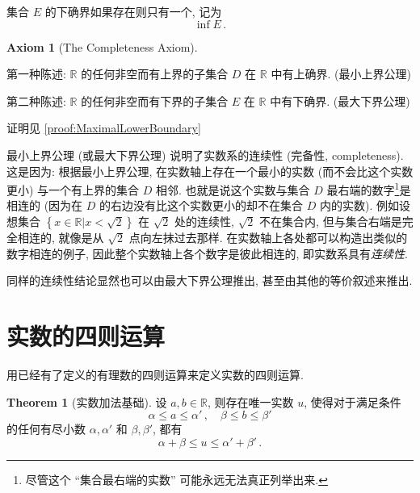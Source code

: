 \documentclass{book}
\newcommand{\set}[1]{\left\{#1\right\}}
\newcommand{\R}{\mathbb{R}}
\numberwithin{equation}{section}
\numberwithin{figure}{section}
\theoremstyle{definition}
\newtheorem{theorem}{Theorem}[section]
\newtheorem{axiom}{Axiom}
\newcommand{\dq}[1]{``#1''}
\begin{document}
集合 $E$ 的下确界如果存在则只有一个, 记为
\begin{equation*}
  \inf E\,.
\end{equation*}

\begin{axiom}[The Completeness Axiom]
\leavevmode

  \begin{description}
    \item 第一种陈述: $\mathbb{R}$ 的任何非空而有上界的子集合 $D$ 在 $\mathbb{R}$ 中有上确界. (最小上界公理)
    \item 第二种陈述: $\mathbb{R}$ 的任何非空而有下界的子集合 $E$ 在 $\mathbb{R}$ 中有下确界. (最大下界公理)
  \end{description}
\end{axiom}

证明见 \cref{proof:MaximalLowerBoundary}

最小上界公理 (或最大下界公理) 说明了实数系的连续性 (完备性, completeness). 这是因为: 根据最小上界公理, 在实数轴上存在一个最小的实数 (而不会比这个实数更小) 与一个有上界的集合 $D$ 相邻. 也就是说这个实数与集合 $D$ 最右端的数字\footnote{尽管这个 \dq{集合最右端的实数} 可能永远无法真正列举出来.}是相连的 (因为在 $D$ 的右边没有比这个实数更小的却不在集合 $D$ 内的实数). 例如设想集合 $\set{x\in\R|x<\sqrt{2}}$ 在 $\sqrt{2}$ 处的连续性, $\sqrt{2}$ 不在集合内, 但与集合右端是完全相连的, 就像是从 $\sqrt{2}$ 点向左抹过去那样. 在实数轴上各处都可以构造出类似的数字相连的例子, 因此整个实数轴上各个数字是彼此相连的, 即实数系具有\emph{连续性}.

同样的连续性结论显然也可以由最大下界公理推出, 甚至由其他的等价叙述来推出.

\section{实数的四则运算}
用已经有了定义的有理数的四则运算来定义实数的四则运算.

\begin{theorem}[实数加法基础]
  设 $a,b\in \mathbb{R}$, 则存在唯一实数 $u$, 使得对于满足条件
  \begin{equation*}
    \alpha\leqslant a\leqslant \alpha'\,,\quad\beta\leqslant b\leqslant\beta'
  \end{equation*}
  的任何有尽小数 $\alpha,\alpha'$ 和 $\beta,\beta'$, 都有
  \begin{equation*}
    \alpha+\beta\leqslant u\leqslant\alpha'+\beta'\,.
  \end{equation*}
\end{theorem}
\end{document}
